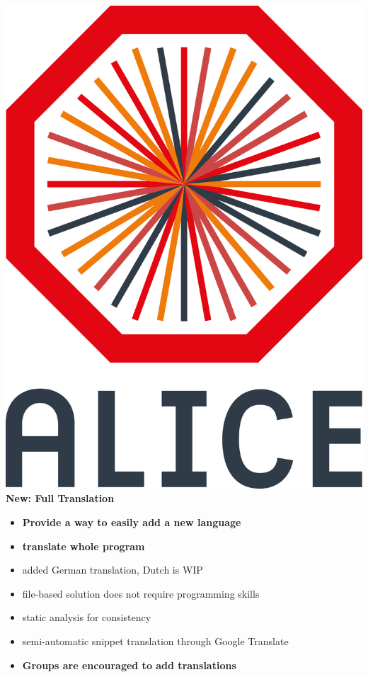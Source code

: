 \documentclass[aspectratio=169,14pt,dvipsnames]{beamer}
\begin{document}
\begin{frame}{\includegraphics[height=0.07\textheight]{2012-Jul-04-4_Color_Logo_CB.png} \hspace{0.2cm}\textbf{New: Full Translation}}
  \begin{itemize}
    \item<1> \textbf{Provide a way to easily add a new language}
    \item<1>\textbf{translate whole program}
    \item<2> added German translation, Dutch is WIP
    \item<2> file-based solution does not require programming skills
    \item<2> static analysis for consistency
    \item<2> semi-automatic snippet translation through Google Translate
    \item<3> \textbf{Groups are encouraged to add translations}
  \end{itemize}
\end{frame}
\end{document}

